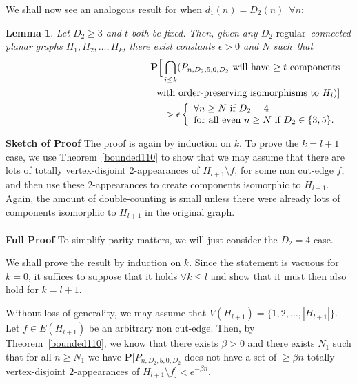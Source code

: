 \documentclass{article}
\newtheorem{Lemma}[Theorem]{Lemma}
\newtheorem{Proof of Theorem}{Proof of Theorem}
\begin{document}
We shall now see an analogous result for when $d_{1}(n)=D_{2}(n)$~$\forall n$:













\begin{Lemma} \label{bounded111}
Let $D_{2} \geq 3$ and $t$ both be fixed.
Then, given any $D_{2}\textrm{-regular}$~connected planar graphs $H_{1},H_{2}, \ldots, H_{k}$,
there exist constants $\epsilon > 0$ and $N$ such~that
\begin{eqnarray*}
& &\mathbf{P}
\Big[ \bigcap_{i \leq k} ( P_{n,D_{2},5,0,D_{2}} 
\textrm{ will have $\geq t$ components} \\
& & \textrm{\phantom{wwwwww}with order-preserving isomorphisms to } H_{i} ) ] \\
& & \phantom{wwwwwwwwwwwwwwwwwww}> \epsilon
\left \{ \begin{array}{ll}
\forall n \geq N \textrm{ if } D_{2}=4 \\
\textrm{for all even } n \geq N \textrm{ if } D_{2} \in \{ 3,5 \}.
\end{array} \right.
\end{eqnarray*}
\end{Lemma}
\textbf{Sketch of Proof}
The proof is again by induction on $k$.
To prove the $k=l+1$ case,
we use Theorem~\ref{bounded110} to show that 
we may assume that there are lots of totally vertex-disjoint $2$-appearances of $H_{l+1} \setminus f$,
for some non cut-edge $f$,
and then use these $2$-appearances to create components isomorphic to $H_{l+1}$.
Again, the amount of double-counting is small unless there were already lots of components isomorphic to $H_{l+1}$
in the original graph. \\
\\
\textbf{Full Proof}
To simplify parity matters,
we will just consider the $D_{2}=4$ case. 

We shall prove the result by induction on $k$.
Since the statement is vacuous for $k=0$,
it suffices to suppose that it holds $\forall k \leq l$
and show that it must then also hold for $k=l+1$.

Without loss of generality,
we may assume that $V(H_{l+1}) = \{ 1,2, \ldots, |H_{l+1}| \}$.
Let $f \in E(H_{l+1})$ be an arbitrary non cut-edge.
Then, by Theorem~\ref{bounded110},
we know that there exists $\beta >0$ and there exists $N_{1}$ such that for all $n \geq N_{1}$ we have
$\mathbf{P}[P_{n,D_{2},5,0,D_{2}}$ does not have a set of 
$\geq \beta n$
totally vertex-disjoint $2$-appearances of $H_{l+1} \setminus f] < e^{- \beta n}$.
\end{document}
